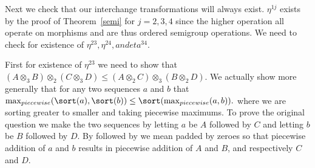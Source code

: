 \documentclass{tac}
\begin{document}
{\begin{enumerate}
% 
%
 
 Next we check that our interchange transformations will always exist. $\eta^{1j}$ exists by
 the proof of Theorem~\ref{semi} for $j=2,3,4$ since the higher operation all operate on morphisms and
 are thus ordered semigroup operations. We need to check for existence of $\eta^{23}, \eta^{24}, and eta^{34}.$
 
 First for existence of $\eta^{23}$ we need to show that
   $(A \otimes_3 B)\otimes_2(C \otimes_3 D) \le (A \otimes_2 C)\otimes_3 (B \otimes_2 D).$
      We actually show more generally that for any two sequences $a$ and $b$ that 
   $\max_{piecewise}(\sort(a),\sort(b)) \le \sort(\max_{piecewise}(a,b)).$
where we are sorting greater to smaller and taking piecewise maximums. 
To prove the original question we make the two sequences by letting $a$ be $A$ followed by 
$C$ and letting $b$ be $B$ followed by $D$. By followed by we mean padded by zeroes so that
piecewise addition of $a$ and $b$ results in piecewise addition of $A$ and $B$, and respectively $C$ and $D.$


\end{enumerate}}
\end{document}

